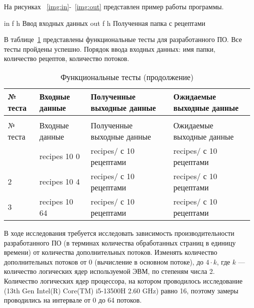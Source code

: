 
На рисунках ~\ref{img:in}-~\ref{img:out} представлен пример работы программы.

\FloatBarrier
{}
{in} %
{f} %
{h} %
{\textwidth} %
{Ввод входных данных} %
\FloatBarrier
\FloatBarrier
{}
{out} %
{f} %
{h} %
{\textwidth} %
{Полученная папка с рецептами} %
\FloatBarrier



В таблице~\ref{tbl:tests} представлены функциональные тесты для разработанного ПО. Все тесты пройдены успешно. Порядок ввода входных данных: имя папки, количество рецептов, количество потоков.

\begin{longtable}{|p{}|p{}|p{}|p{}|}
    \caption{Функциональные тесты}\label{tbl:tests} \\\hline
    № теста & Входные данные & Полученные выходные данные & Ожидаемые выходные данные                                          \\\hline
    \endfirsthead
    \caption{Функциональные тесты (продолжение)} \\\hline
    № теста & Входные данные & Полученные выходные данные  & Ожидаемые выходные данные                                                 \\\hline
    \endhead
    \endfoot
    1                                           & recipes 10 0 & recipes/ с 10 рецептами & recipes/ с 10 рецептами \\\hline
    2                                           & recipes 10 4 & recipes/ с 10 рецептами & recipes/ с 10 рецептами \\\hline
    3                                           & recipes 10 64 & recipes/ с 10 рецептами & recipes/ с 10 рецептами \\\hline
    \end{longtable}


В ходе исследования требуется исследовать зависимость производительности разработанного ПО (в терминах количества обработанных страниц в единицу времени) от количества дополнительных потоков. Изменять количество дополнительных потоков от 0 (вычисление в основном потоке), до $4\cdot k$, где $k$ --- количество логических ядер используемой ЭВМ, по степеням числа 2. Количество логических ядер процессора, на котором проводилось исследование (13th Gen Intel(R) Core(TM) i5-13500H   2.60 GHz) равно 16, поэтому замеры проводились на интервале от 0 до 64 потоков.
\newpage

